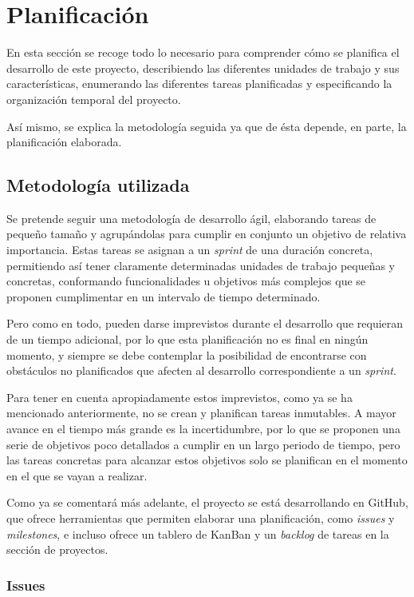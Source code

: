 \chapter{Planificación}

En esta sección se recoge todo lo necesario para comprender cómo se planifica el desarrollo de este proyecto, describiendo las diferentes unidades de trabajo y sus características, enumerando las diferentes tareas planificadas y especificando la organización temporal del proyecto.

Así mismo, se explica la metodología seguida ya que de ésta depende, en parte, la planificación elaborada.

\section{Metodología utilizada}

Se pretende seguir una metodología de desarrollo ágil, elaborando tareas de pequeño tamaño y agrupándolas para cumplir en conjunto un objetivo de relativa importancia. Estas tareas se asignan a un \textit{sprint} de una duración concreta, permitiendo así tener claramente determinadas unidades de trabajo pequeñas y concretas, conformando funcionalidades u objetivos más complejos que se proponen cumplimentar en un intervalo de tiempo determinado.

Pero como en todo, pueden darse imprevistos durante el desarrollo que requieran de un tiempo adicional, por lo que esta planificación no es final en ningún momento, y siempre se debe contemplar la posibilidad de encontrarse con obstáculos no planificados que afecten al desarrollo correspondiente a un \textit{sprint}.

Para tener en cuenta apropiadamente estos imprevistos, como ya se ha mencionado anteriormente, no se crean y planifican tareas inmutables. A mayor avance en el tiempo más grande es la incertidumbre, por lo que se proponen una serie de objetivos poco detallados a cumplir en un largo periodo de tiempo, pero las tareas concretas para alcanzar estos objetivos solo se planifican en el momento en el que se vayan a realizar.

Como ya se comentará más adelante, el proyecto se está desarrollando en GitHub, que ofrece herramientas que permiten elaborar una planificación, como \textit{issues} y \textit{milestones}, e incluso ofrece un tablero de KanBan y un \textit{backlog} de tareas en la sección de proyectos.

\subsection{Issues}

